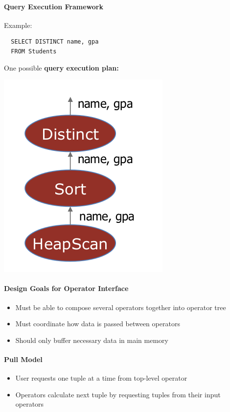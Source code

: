\paragraph{Query Execution Framework}
Example:
\begin{lstlisting}
  SELECT DISTINCT name, gpa
  FROM Students
\end{lstlisting}

One possible \textbf{query execution plan:}

\includegraphics[scale=0.15]{graphics/qu-ex-plan.png}


\paragraph{Design Goals for Operator Interface}
\begin{itemize}
\item Must be able to compose several operators together into
  operator tree
\item Must coordinate how data is passed between operators
\item Should only buffer necessary data in main memory
\end{itemize}


\paragraph{Pull Model}
\begin{itemize}
\item User requests one tuple at a time from top-level operator
\item Operators calculate next tuple by requesting tuples from their
  input operators
\end{itemize}

